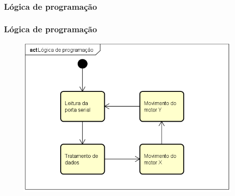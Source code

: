 \subsubsection{Lógica de programação}

\begin{frame}
\frametitle{Lógica de programação}

\begin{figure}
\centering
\includegraphics[scale = 0.5]{figs/fluxoexecucao}
\end{figure}

\end{frame}
